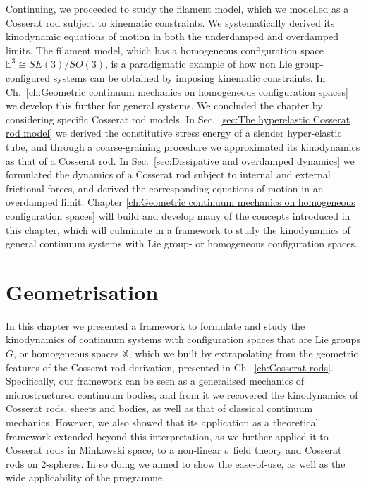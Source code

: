 \documentclass[]{cam-thesis}
\begin{document}
Continuing, we proceeded to study the filament model, which we modelled as a Cosserat rod subject to kinematic constraints. We systematically derived its kinodynamic equations of motion in both the underdamped and overdamped limits. The filament model, which has a homogeneous configuration space $\mathbb{E}^3 \cong SE(3)/SO(3)$, is a paradigmatic example of how non Lie group-configured systems can be obtained by imposing kinematic constraints. In Ch.~\ref{ch:Geometric continuum mechanics on homogeneous configuration spaces} we develop this further for general systems. We concluded the chapter by considering specific Cosserat rod models. In Sec.~\ref{sec:The hyperelastic Cosserat rod model} we derived the constitutive stress energy of a slender hyper-elastic tube, and through a coarse-graining procedure we approximated its kinodynamics as that of a Cosserat rod. In Sec.~\ref{sec:Dissipative and overdamped dynamics} we formulated the dynamics of a Cosserat rod subject to internal and external frictional forces, and derived the corresponding equations of motion in an overdamped limit. Chapter \ref{ch:Geometric continuum mechanics on homogeneous configuration spaces} will build and develop many of the concepts introduced in this chapter, which will culminate in a framework to study the kinodynamics of general continuum systems with Lie group- or homogeneous configuration spaces. 



\section{Geometrisation}


In this chapter we presented a framework to formulate and study the kinodynamics of continuum systems with configuration spaces that are Lie groups $G$, or homogeneous spaces $\mathbb{X}$, which we built by extrapolating from the geometric features of the Cosserat rod derivation, presented in Ch.~\ref{ch:Cosserat rods}. Specifically, our framework can be seen as a generalised mechanics of microstructured continuum bodies, and from it we recovered the kinodynamics of Cosserat rods, sheets and bodies, as well as that of classical continuum mechanics. However, we also showed that its application as a theoretical framework extended beyond this interpretation, as we further applied it to Cosserat rods in Minkowski space, to a non-linear $\sigma$ field theory and Cosserat rods on $2$-spheres. In so doing we aimed to show the ease-of-use, as well as the wide applicability of the programme.
\end{document}
